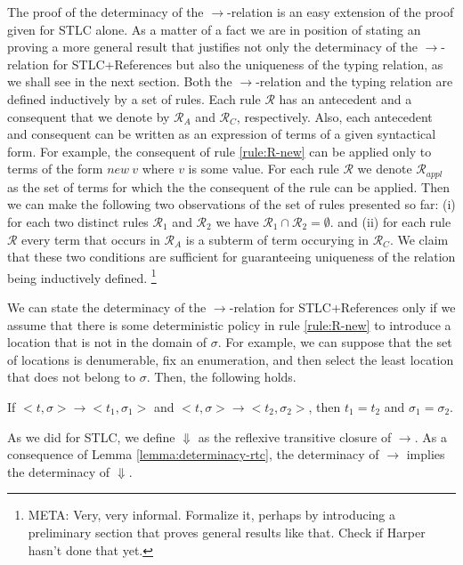 The proof of the determinacy of the $\to$-relation is an easy extension of the proof given for STLC alone. As a matter of a fact we are in position of stating an proving a more general result that justifies not only the determinacy of the $\to$-relation for STLC+References but also the uniqueness of the typing relation, as we shall see in the next section. Both the $\to$-relation and the typing relation are defined inductively by a set of rules. Each rule $\mathcal{R}$ has an antecedent and a consequent that we denote by $\mathcal{R}_A$ and $\mathcal{R}_C$, respectively. Also, each antecedent and consequent can be written as an expression  of terms of a given syntactical form. For example, the consequent of rule \eqref{rule:R-new} can be applied only to terms of the form $new \ v$ where $v$ is some value. For each rule $\mathcal{R}$ we denote $\mathcal{R}_{appl}$ as the set of terms for which the the consequent of the rule can be applied. Then we can make the following two observations of the set of rules presented so far: (i) for each two distinct rules $\mathcal{R}_1$ and $\mathcal{R}_2$  we have $\mathcal{R}_1 \cap \mathcal{R}_2 = \emptyset$. and (ii) for each rule $\mathcal{R}$ every term that occurs in $\mathcal{R}_A$ is a subterm of term occurying in $\mathcal{R}_C$. We claim that these two conditions are sufficient for guaranteeing uniqueness of the relation being inductively defined. \footnote{META: Very, very informal. Formalize it, perhaps by introducing a preliminary section that proves general results like that. Check if Harper hasn't done that yet.}

We can state the determinacy of the $\to$-relation for STLC+References only if we assume that there is some deterministic policy in rule \eqref{rule:R-new} to introduce a location that is not in the domain of $\sigma$. For example, we can suppose that the set of locations is denumerable, fix an enumeration, and then select the least location that does not belong to $\sigma$. Then, the following holds. 

\begin{lemma}
If ${<}t, \sigma{>} \to {<}t_1, \sigma_1{>}$ and ${<}t, \sigma{>} \to {<}t_2, \sigma_2{>}$, then $t_1 = t_2$ and $\sigma_1 = \sigma_2$. 
\end{lemma}

As we did for STLC, we define $\Downarrow$ as the reflexive transitive closure of $\to$.  As a consequence of Lemma \eqref{lemma:determinacy-rtc}, the determinacy of $\to$ implies the determinacy of $\Downarrow$. 


